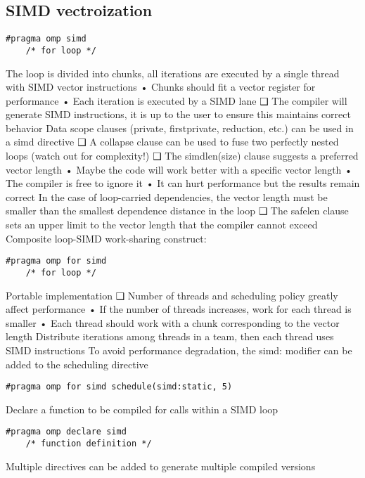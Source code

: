 \subsection{SIMD vectroization}
\begin{lstlisting}[style=C]
#pragma omp simd
    /* for loop */
\end{lstlisting}
The loop is divided into chunks, all iterations are
executed by a single thread with SIMD vector
instructions
• Chunks should fit a vector register for
performance
• Each iteration is executed by a SIMD lane
❑ The compiler will generate SIMD instructions, it is
up to the user to ensure this maintains correct
behavior
Data scope clauses (private, firstprivate,
reduction, etc.) can be used in a simd directive
❑ A collapse clause can be used to fuse two
perfectly nested loops (watch out for complexity!)
❑ The simdlen(size) clause suggests a preferred
vector length
• Maybe the code will work better with a specific
vector length
• The compiler is free to ignore it
• It can hurt performance but the results remain
correct
In the case of loop-carried dependencies, the
vector length must be smaller than the smallest
dependence distance in the loop
❑ The safelen clause sets an upper limit to the
vector length that the compiler cannot exceed
Composite loop-SIMD work-sharing construct:
\begin{lstlisting}[style=C]
#pragma omp for simd
    /* for loop */
\end{lstlisting}
Portable implementation
❑ Number of threads and scheduling policy greatly
affect performance
• If the number of threads increases, work for
each thread is smaller
• Each thread should work with a chunk
corresponding to the vector length
Distribute iterations among threads in a team, then
each thread uses SIMD instructions
To avoid performance degradation, the simd:
modifier can be added to the scheduling directive
\begin{lstlisting}[style=C]
#pragma omp for simd schedule(simd:static, 5) 
\end{lstlisting}
Declare a function to be compiled for calls within a
SIMD loop
\begin{lstlisting}[style=C]
#pragma omp declare simd
    /* function definition */
\end{lstlisting}
Multiple directives can be added to generate
multiple compiled versions


